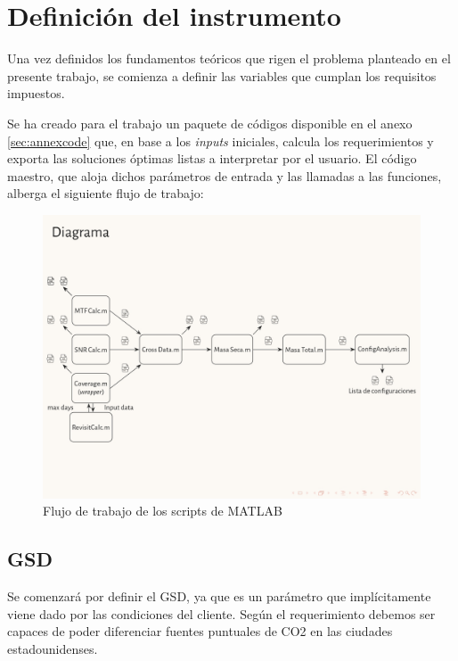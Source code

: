 \chapter{Definición del instrumento}
\minitoc

Una vez definidos los fundamentos teóricos que rigen el problema planteado en el presente trabajo, se comienza a definir las variables que cumplan los requisitos impuestos.

Se ha creado para el trabajo un paquete de códigos disponible en el anexo \ref{sec:annexcode} que, en base a los \textit{inputs} iniciales, calcula los requerimientos y exporta las soluciones óptimas listas a interpretar por el usuario. El código maestro, que aloja dichos parámetros de entrada y las llamadas a las funciones, alberga el siguiente flujo de trabajo:

\begin{landscape}
    

\begin{figure}[H]
    \centering
    \includegraphics[width=1\linewidth]{4.Payload/workflow.jpg}
    \caption{Flujo de trabajo de los scripts de MATLAB}
    \label{fig:flowchart}
\end{figure}
\end{landscape}
\newpage

\section{GSD}

Se comenzará por definir el GSD, ya que es un parámetro que implícitamente viene dado por las condiciones del cliente. Según el requerimiento debemos ser capaces de poder diferenciar fuentes puntuales de CO2 en las ciudades estadounidenses.

